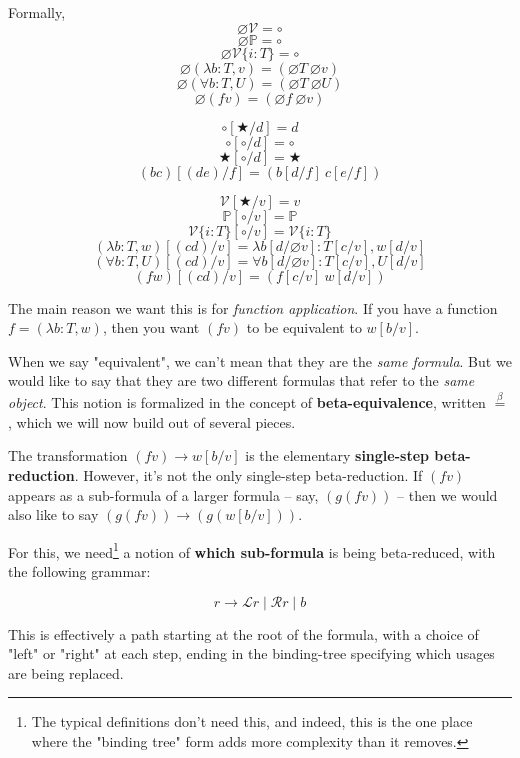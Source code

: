 \documentclass{article}
\newcommand{\Prop}{\mathbb{P}}
\newcommand{\usage}{\mathcal{V}}
\newcommand{\usageKnown}[2]{\usage\{#2:#1\}}
\newcommand{\subst}[3]{#1[{#2}{/}{#3}]}
\newcommand{\bindvariable}{\bigstar}
\newcommand{\bindnotthis}{\circ}
\newcommand{\emptybindingslike}[1]{\varnothing #1}
\newcommand{\betaeq}{\overset{\beta}{=}}
\begin{document}
  Formally,  
  \[\emptybindingslike{\usage} = \bindnotthis\]
  \[\emptybindingslike{\Prop} = \bindnotthis\]
  \[\emptybindingslike{\usageKnown{T}{i}} = \bindnotthis\]
  \[\emptybindingslike{(\lambda b:T,v)} = (\emptybindingslike{T}\ \emptybindingslike{v})\]
  \[\emptybindingslike{(\forall b:T,U)} = (\emptybindingslike{T}\ \emptybindingslike{U})\]
  \[\emptybindingslike{(f v)} = (\emptybindingslike{f}\ \emptybindingslike{v})\]
    
  \[\subst{\bindnotthis}{\bindvariable}{d} = d\]
  \[\subst{\bindnotthis}{\bindnotthis}{d} = \bindnotthis\]
  \[\subst{\bindvariable}{\bindnotthis}{d} = \bindvariable\]
  \[\subst{(bc)}{(de)}{f} = (\subst{b}{d}{f}\ \subst{c}{e}{f})\]
  
  \[\subst{\usage}{\bindvariable}{v} = v\]
  \[\subst{\Prop}{\bindnotthis}{v} = \Prop\]
  \[\subst{\usageKnown{T}{i}}{\bindnotthis}{v} = \usageKnown{T}{i}\]
  \[\subst{(\lambda b:T,w)}{(cd)}{v} = \lambda \subst{b}{d}{\emptybindingslike{v}}:\subst{T}{c}{v},\subst{w}{d}{v}\]
  \[\subst{(\forall b:T,U)}{(cd)}{v} = \forall \subst{b}{d}{\emptybindingslike{v}}:\subst{T}{c}{v},\subst{U}{d}{v}\]
  \[\subst{(f w)}{(cd)}{v} = (\subst{f}{c}{v}\ \subst{w}{d}{v})\]

The main reason we want this is for \emph{function application}. If you have a function $f =(\lambda b:T,w)$, then you want $(f v)$ to be equivalent to $\subst{w}{b}{v}$.

When we say "equivalent", we can't mean that they are the \emph{same formula}. But we would like to say that they are two different formulas that refer to the \emph{same object}. This notion is formalized in the concept of \textbf{beta-equivalence}, written $\betaeq$, which we will now build out of several pieces.

The transformation $(f v) \rightarrow \subst{w}{b}{v}$ is the elementary \textbf{single-step beta-reduction}. However, it's not the only single-step beta-reduction. If $(f v)$ appears as a sub-formula of a larger formula – say, $(g (f v))$ – then we would also like to say $(g (f v)) \rightarrow (g(\subst{w}{b}{v}))$.

For this, we need\footnote{The typical definitions don't need this, and indeed, this is the one place where the "binding tree" form adds more complexity than it removes.} a notion of \textbf{which sub-formula} is being beta-reduced, with the following grammar:

\[r \rightarrow \mathcal{L}r \mid \mathcal{R}r \mid b\]
  
  This is effectively a path starting at the root of the formula, with a choice of "left" or "right" at each step, ending in the binding-tree specifying which usages are being replaced.
  
\end{document}
